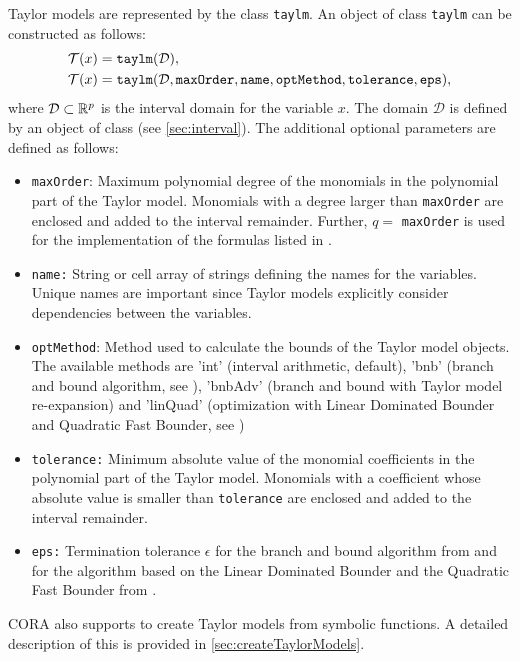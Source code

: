 Taylor models are represented by the class \texttt{taylm}. An object of class \texttt{taylm} can be constructed as follows:
\begin{equation*}
	\begin{split}
		& \mathcal{T}(x) = {\normalfont \texttt{taylm}}(\mathcal{D}), \\
		& \mathcal{T}(x) = {\normalfont \texttt{taylm}}(\mathcal{D},\texttt{maxOrder},\texttt{name},\texttt{optMethod},\texttt{tolerance},\texttt{eps}),
	\end{split}
\end{equation*}
where $\mathcal{D} \subset \mathbb{R}^p$ is the interval domain for the variable $x$. The domain $\mathcal{D}$ is defined by an object of class  (see \cref{sec:interval}). The additional optional parameters are defined as follows:
\begin{itemize}
	\item \texttt{maxOrder}: Maximum polynomial degree of the monomials in the polynomial part of the Taylor model. Monomials with a degree larger than \texttt{maxOrder} are enclosed and added to the interval remainder. Further, $q = $ \texttt{maxOrder} is used for the implementation of the formulas listed in \cite[Appendix~A]{Althoff2018b}. 
	\item \texttt{name:} String or cell array of strings defining the names for the variables. Unique names are important since Taylor models explicitly consider dependencies between the variables.
	\item \texttt{optMethod}: Method used to calculate the bounds of the Taylor model objects. The available methods are 'int' (interval arithmetic, default), 'bnb' (branch and bound algorithm, see \cite[Sec.~2.3.2]{Althoff2018b}), 'bnbAdv' (branch and bound with Taylor model re-expansion) and 'linQuad' (optimization with Linear Dominated Bounder and Quadratic Fast Bounder, see \cite[Sec.~2.3.3]{Althoff2018b})
	\item \texttt{tolerance:} Minimum absolute value of the monomial coefficients in the polynomial part of the Taylor model. Monomials with a coefficient whose absolute value is smaller than \texttt{tolerance} are enclosed and added to the interval remainder.
	\item \texttt{eps:} Termination tolerance $\epsilon$ for the branch and bound algorithm from \cite[Sec.~2.3.2]{Althoff2018b} and for the algorithm based on the Linear Dominated Bounder and the Quadratic Fast Bounder from \cite[Sec.~2.3.3]{Althoff2018b}.
\end{itemize}
CORA also supports to create Taylor models from symbolic functions. A detailed description of this is provided in \cref{sec:createTaylorModels}.

